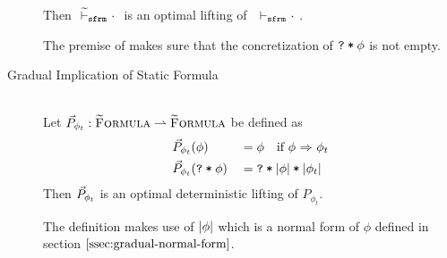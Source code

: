 \begin{description}
\begin{lemma}
        Then $~{\widetilde{\vdash}_\texttt{sfrm}}\,\, \cdot~$ is an optimal lifting of $~\,\,{\vdash_\texttt{sfrm}}\,\, \cdot~$.
    \end{lemma}
    The premise of  makes sure that the concretization of $\textup{\texttt{\textup{\texttt{?}}\:*\:\ensuremath{\phi}}}$ is not empty.
    
    \item[Gradual Implication of Static Formula]
    \begin{lemma}~\\
        Let $\vec{P}_{\phi_t} : \textup{\textsc{\ensuremath{\widetilde{\text{F}}}ormula}} \rightharpoonup \textup{\textsc{\ensuremath{\widetilde{\text{F}}}ormula}}$ be defined as
        \begin{alignat*}{2}
        & \vec{P}_{\phi_t}(\phi)          & &= \phi  \quad\text{if } {\phi} \,\,{\Rightarrow}\,\, {\phi_t} \\
        & \vec{P}_{\phi_t}(\textup{\texttt{\textup{\texttt{?}}\:*\:\ensuremath{\phi}}}) & &= \textup{\texttt{\textup{\texttt{?}}\:*\:\ensuremath{\textup{\texttt{\ensuremath{|\phi|}\:*\:\ensuremath{|\phi_t|}}}}}}
        \end{alignat*}
        Then $\vec{P}_{\phi_t}$ is an optimal deterministic lifting of $P_{\phi_t}$.
    \end{lemma}
    The definition makes use of $|\phi|$ which is a normal form of $\phi$ defined in section $\ref{ssec:gradual-normal-form}$.
    
    \begin{comment}
    \item[Gradual Formula Extraction]
    Formula extraction is dual to the separating conjunction in a sense that it weakens given formula $\phi$ enough (yielding formula $\phi'$) such that $\phiImplies{\phi}{\phiCons{$\phi_r$}{$\phi'$}}$ holds for some $\phi_r$.\\
    Note that this operation requires that $\phiImplies{\phi}{\phi_r}$ holds.
    
    This operation would be the identity in a classical setting (because $\phiImplies{\phi}{\phiAnd{$\phi_r$}{$\phi$}}$ holds), however the linear nature of implicit dynamic frames requires that $\phi'$ and $\phi_r$ give access to disjoint memory locations.
    We claim that there exists a partial function $\dgrad{P}_{\phi_t} : \setGFormula \rightharpoonup \setGFormula$ with desired behavior, as required in section \ref{sec:gradual-liftings}.
    
    \begin{example}{Behavior of $\dgrad{P}$}
        \begin{align*}
        &\dgrad{P}_{\phi}(\grad{\phi}) = \grad{\phi}    \quad\quad \text{if } \staticFP{\phi} = \emptyset
        &\dgrad{P}_{\phiAcc{x}{f}}(\phiAcc{y}{f}) = \grad{\phi}    \quad\quad \text{if } \staticFP{\phi} = \emptyset
        \end{align*}
    \end{example}
    

\end{comment}
\end{description}
